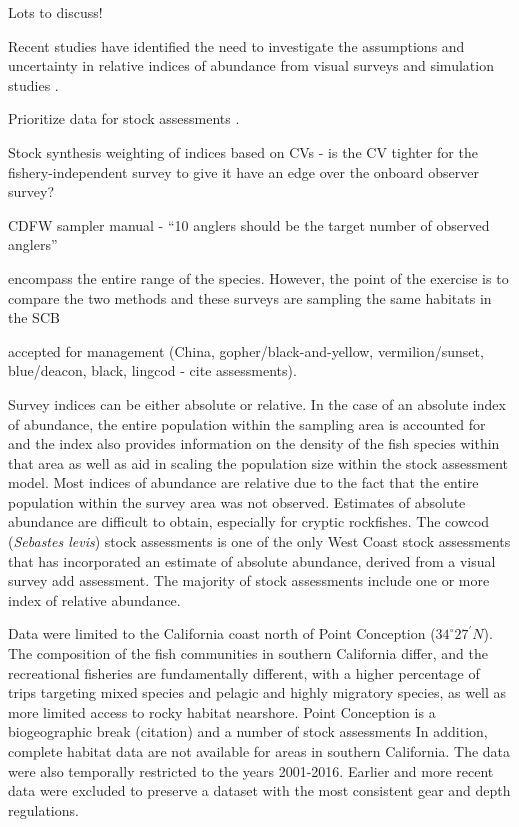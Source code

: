 \documentclass[
  authoryear,
  preprint,
  3p]{elsarticle}
\begin{document}
Lots to discuss!

Recent studies have identified the need to investigate the assumptions
and uncertainty in relative indices of abundance from visual surveys
\citep{Bacheler:2015:ERA, Campbell:2015:CRA} and simulation studies
\citep{Siegfried:2016:ISA}.

Prioritize data for stock assessments \citep{Magnusson:2007:WMF}.

Stock synthesis weighting of indices based on CVs - is the CV tighter
for the fishery-independent survey to give it have an edge over the
onboard observer survey?

CDFW sampler manual - ``10 anglers should be the target number of
observed anglers''

encompass the entire range of the species. However, the point of the
exercise is to compare the two methods and these surveys are sampling
the same habitats in the SCB

accepted for management (China, gopher/black-and-yellow,
vermilion/sunset, blue/deacon, black, lingcod - cite assessments).

Survey indices can be either absolute or relative. In the case of an
absolute index of abundance, the entire population within the sampling
area is accounted for and the index also provides information on the
density of the fish species within that area as well as aid in scaling
the population size within the stock assessment model. Most indices of
abundance are relative due to the fact that the entire population within
the survey area was not observed. Estimates of absolute abundance are
difficult to obtain, especially for cryptic rockfishes. The cowcod
(\emph{Sebastes levis}) stock assessments is one of the only West Coast
stock assessments that has incorporated an estimate of absolute
abundance, derived from a visual survey \citep{Love:2009:DFA} add
assessment. The majority of stock assessments include one or more index
of relative abundance.

Data were limited to the California coast north of Point Conception
(\(34^\circ 27^\prime N\)). The composition of the fish communities in
southern California differ, and the recreational fisheries are
fundamentally different, with a higher percentage of trips targeting
mixed species and pelagic and highly migratory species, as well as more
limited access to rocky habitat nearshore. Point Conception is a
biogeographic break (citation) and a number of stock assessments In
addition, complete habitat data are not available for areas in southern
California. The data were also temporally restricted to the years
2001-2016. Earlier and more recent data were excluded to preserve a
dataset with the most consistent gear and depth regulations.
\end{document}
